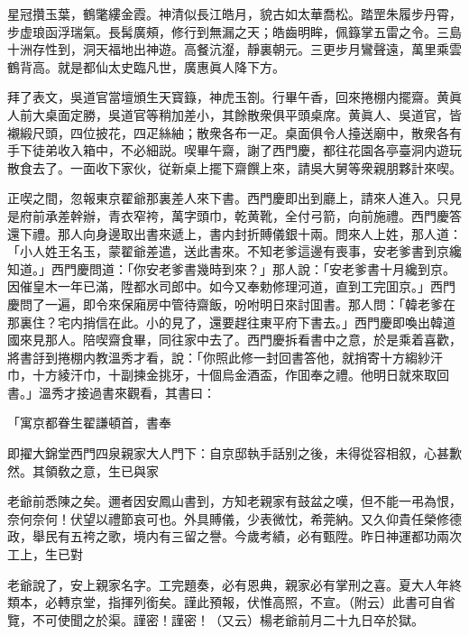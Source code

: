 \begin{myquote}
星冠攢玉葉，鶴氅縷金霞。神清似長江皓月，貌古如太華喬松。踏罡朱履步丹霄，步虚琅函浮瑞氣。長髯廣頰，修行到無漏之天；皓齒明眸，佩籙掌五雷之令。三島十洲存性到，洞天福地出神遊。高餐沆瀣，靜裏朝元。三更步月鸞聲遠，萬里乘雲鶴背高。就是都仙太史臨凡世，廣惠眞人降下方。
\end{myquote}

拜了表文，吳道官當壇頒生天寳籙，神虎玉劄。行畢午香，回來捲棚内擺齋。黄眞人前大桌面定勝，吳道官等稍加差小，其餘散衆俱平頭桌席。黄眞人、吳道官，皆襯緞尺頭，四位披花，四疋絲紬；散衆各布一疋。桌面俱令人擡送廟中，散衆各有手下徒弟收入箱中，不必細説。喫畢午齋，謝了西門慶，都往花園各亭臺洞内遊玩散食去了。一面收下家伙，従新桌上擺下齋饌上來，請吳大舅等衆親朋夥計來喫。

正喫之間，忽報東京翟爺那裏差人來下書。西門慶即出到廳上，請來人進入。只見是府前承差幹辦，青衣窄袴，萬字頭巾，乾黄靴，全付弓箭，向前施禮。西門慶答還下禮。那人向身邊取出書來遞上，書内封折賻儀銀十兩。問來人上姓，那人道：「小人姓王名玉，蒙翟爺差遣，送此書來。不知老爹這邊有喪事，安老爹書到京纔知道。」西門慶問道：「你安老爹書幾時到來？」那人說：「安老爹書十月纔到京。因催皇木一年已滿，陞都水司郎中。如今又奉勅修理河道，直到工完囬京。」西門慶問了一遍，即令來保廂房中管待齋飯，吩咐明日來討囬書。那人問：「韓老爹在那裏住？宅内捎信在此。小的見了，還要趕往東平府下書去。」西門慶即喚出韓道國來見那人。陪喫齋食畢，同往家中去了。西門慶拆看書中之意，於是乘着喜歡，將書㧱到捲棚内教溫秀才看，說：「你照此修一封回書答他，就捎寄十方縐紗汗巾，十方綾汗巾，十副揀金挑牙，十個烏金酒盃，作囬奉之禮。他明日就來取回書。」溫秀才接過書來觀看，其書曰：

\begin{myquote}[\markfont]
\hspace*{4em}「寓京都眷生翟謙頓首，書奉

即擢大錦堂西門四泉親家大人門下：自京邸執手話别之後，未得從容相叙，心甚歉然。其領敎之意，生已與家

老爺前悉陳之矣。邇者因安鳳山書到，方知老親家有鼓盆之嘆，但不能一弔為恨，奈何奈何！伏望以禮節哀可也。外具賻儀，少表微忱，希莞納。又久仰貴任榮修德政，舉民有五袴之歌，境内有三留之譽。今歲考績，必有甄陞。昨日神運都功兩次工上，生已對

老爺說了，安上親家名字。工完題奏，必有恩典，親家必有掌刑之喜。夏大人年終類本，必轉京堂，指揮列銜矣。謹此預報，伏惟高照，不宣。{\kaishu（附云）}此書可自省覽，不可使聞之於渠。謹密！謹密！{\kaishu（又云）}楊老爺前月二十九日卒於獄。

\end{myquote}

